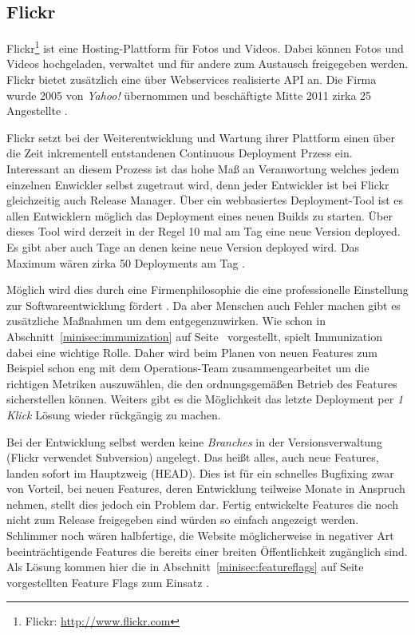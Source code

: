 \subsection{Flickr}

Flickr\footnote{Flickr: \url{http://www.flickr.com}} ist eine
Hosting-Plattform für Fotos und Videos. Dabei können Fotos und Videos
hochgeladen, verwaltet und für andere zum Austausch freigegeben werden. Flickr
bietet zusätzlich eine über Webservices realisierte API an. Die Firma wurde
2005 von \emph{Yahoo!} übernommen und beschäftigte Mitte 2011 zirka 25
Angestellte \cite{flickr11}.

Flickr setzt bei der Weiterentwicklung und Wartung ihrer Plattform einen über
die Zeit inkrementell entstandenen Continuous Deployment Przess ein.
Interessant an diesem Prozess ist das hohe Maß an Veranwortung welches jedem
einzelnen Enwickler selbst zugetraut wird, denn jeder Entwickler ist bei
Flickr gleichzeitig auch Release Manager. Über ein webbasiertes Deployment-Tool
ist es allen Entwicklern möglich das Deployment eines neuen Builds zu
starten. Über dieses Tool wird derzeit in der Regel 10 mal am Tag eine neue
Version deployed. Es gibt aber auch Tage an denen keine neue Version deployed
wird. Das Maximum wären zirka 50 Deployments am Tag \cite{flickr11}.

Möglich wird dies durch eine Firmenphilosophie die eine professionelle
Einstellung zur Softwareentwicklung fördert \cite{flickr11}. Da aber Menschen
auch Fehler machen gibt es zusätzliche Maßnahmen um dem entgegenzuwirken. Wie
schon in Abschnitt~\ref{minisec:immunization} auf
Seite~\pageref{minisec:immunization} vorgestellt, spielt Immunization dabei
eine wichtige Rolle. Daher wird beim Planen von neuen Features zum Beispiel
schon eng mit dem Operations-Team zusammengearbeitet um die richtigen Metriken
auszuwählen, die den ordnungsgemäßen Betrieb des Features sicherstellen
können. Weiters gibt es die Möglichkeit das letzte Deployment per \emph{1
Klick} Lösung wieder rückgängig zu machen.

 Bei der Entwicklung selbst werden keine \emph{Branches} in
der Versionsverwaltung (Flickr verwendet Subversion) angelegt. Das heißt
alles, auch neue Features, landen sofort im Hauptzweig (HEAD). Dies ist für
ein schnelles Bugfixing zwar von Vorteil, bei neuen Features, deren
Entwicklung teilweise Monate in Anspruch nehmen, stellt dies jedoch ein
Problem dar. Fertig entwickelte Features die noch nicht zum Release
freigegeben sind würden so einfach angezeigt werden. Schlimmer noch wären
halbfertige, die Website möglicherweise in negativer Art beeinträchtigende
Features die bereits einer breiten Öffentlichkeit zugänglich sind. Als Lösung
kommen hier die in Abschnitt~\ref{minisec:featureflags} auf
Seite~\pageref{minisec:featureflags} vorgestellten Feature Flags zum Einsatz
\cite{flickr09}.

